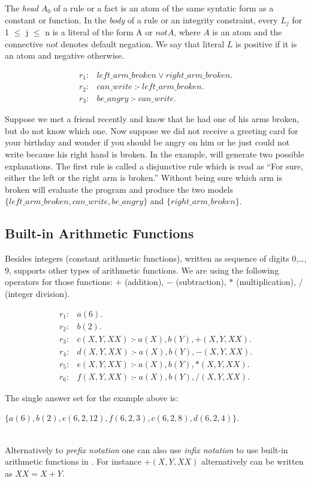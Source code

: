 \documentclass[14pt,a4paper, titlepage]{article}
\DeclareMathOperator{\leftimpl}{:-}
\begin{document}
The \emph{head} $A_0$ of a rule or a fact is an atom of the same syntatic form as a constant or function. In the \emph{body} of a rule or an integrity constraint, every $L_j$ for 1 $\leq$ j $\leq$ n is a literal of the form A or $\mathit{not}A$, where $A$ is an atom and the connective $\mathit{not}$ denotes default negation. We say that literal $L$ is positive if it is an atom and negative otherwise. 
\begin{exmp}
\begin{align*}
r_1\colon& \mathit{left\_arm\_broken} \vee \mathit{right\_arm\_broken}.\\
r_2\colon& \mathit{can\_write} \leftimpl \mathit{left\_arm\_broken}.\\
r_3\colon& \mathit{be\_angry} \leftimpl \mathit{can\_write}.
\end{align*}
\end{exmp}
Suppose we met a friend recently and know that he had one of his arms broken, but do not know which one. Now suppose we did not receive a greeting card for your birthday and wonder if you should be angry on him or he just could not write because his right hand is broken. In the example, \dlvhex{} will generate two possible explanations. The first rule is called a disjunctive rule which is read as \enquote{For sure, either the left or the right arm is broken.} Without being sure which arm is broken \dlvhex{} will evaluate the program and produce the two models $\mathit{\{left\_arm\_broken, can\_write, be\_angry\}}$ and $\mathit{\{right\_arm\_broken\}}$.  

\subsection{Built-in Arithmetic Functions}
Besides integers (constant arithmetic functions), written as sequence of digits $0$,\dots,$9$, \dlvhex{} supports other types of arithmetic functions. We are using the following operators for those functions: $+$ (addition), $-$ (subtraction), $*$ (multiplication), $/$ (integer division). 
\begin{exmp}
\begin{align*}
r_1\colon& \mathit{a}(6). \\
r_2\colon& \mathit{b}(2). \\
r_3\colon& c(X,Y,XX) \leftimpl a(X), b(Y),+(X, Y, XX). \\
r_4\colon& d(X,Y,XX) \leftimpl a(X), b(Y),-(X, Y, XX). \\
r_5\colon& e(X,Y,XX) \leftimpl a(X), b(Y),*(X, Y, XX). \\
r_6\colon& f(X,Y,XX) \leftimpl a(X), b(Y),/(X, Y, XX).
\end{align*}
\end{exmp}
The single answer set for the example above is:\\ \centerline{$\mathit{\{a(6),b(2),e(6,2,12),f(6,2,3),c(6,2,8),d(6,2,4)\}}$.}
\\Alternatively to \emph{prefix notation} one can also use \emph{infix notation} to use built-in arithmetic functions in \dlvhex{}. For instance $\mathit{+(X, Y, XX)}$ alternatively can be written as $\mathit{XX=X+Y}$. 
\end{document}
